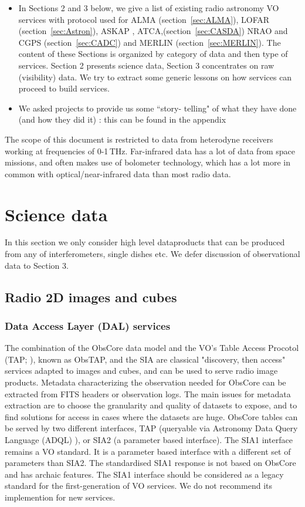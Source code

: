 \documentclass[11pt,a4paper]{ivoa}
\begin{document}
\begin{itemize}
\item  In Sections 2 and 3 below, we give a list of existing radio astronomy VO services with protocol used for ALMA (section~\ref{sec:ALMA}), LOFAR (section~\ref{sec:Astron}), ASKAP  , ATCA,(section~\ref{sec:CASDA}) NRAO and CGPS (section~\ref{sec:CADC}) and MERLIN (section~\ref{sec:MERLIN}).
The content of these Sections is organized  by category of data and then type of services. Section 2 presents science data, Section 3 concentrates on raw (visibility) data. We try to extract some generic lessons on how services can proceed to build services.
\item We asked projects to provide us some ``story- telling" of what they have done (and how they did it) : this can be found in the appendix
\end{itemize}

The scope of this document is restricted to data from heterodyne receivers working at frequencies of 0-1\,THz. Far-infrared data has a lot of data from space missions, and often makes use of bolometer technology, which has a lot more in common with optical/near-infrared data than most radio data.

\section{Science data}

In this section we only consider high level dataproducts that can be produced from any of interferometers, single dishes etc. We defer discussion of observational data to Section 3.   



\subsection{Radio 2D images and cubes}
\subsubsection{Data Access Layer (DAL) services}
The combination of the ObsCore data model and the VO's Table Access Procotol (TAP; \cite{std:TAP}), known as ObsTAP, and the SIA are classical "discovery, then access" services adapted to images and cubes, and can be used to serve radio image products. Metadata characterizing the observation needed for ObsCore can be extracted from FITS headers or observation logs. The main issues for metadata extraction are to choose the granularity and quality of datasets to expose, and to find solutions for access in cases where the datasets are huge. ObsCore tables can be served by two different interfaces, TAP  (queryable via Astronomy Data Query Language (ADQL) \citep{2008ivoa.spec.1030O} ), or SIA2 (a parameter based interface). The SIA1 interface remains a VO standard. It is a parameter based interface with a different set of parameters than SIA2. The standardised SIA1 response is not based on ObsCore and has archaic features. The SIA1 interface should be considered as a legacy standard for the first-generation of VO services. We do not recommend its implemention for new services.    
\end{document}
